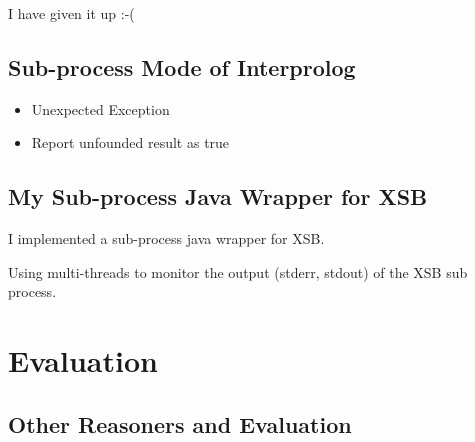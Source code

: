 \documentclass{article}
\begin{document}
I have given it up :-(


\subsection{Sub-process Mode of Interprolog}

\begin{itemize}
\item Unexpected Exception
\item Report unfounded result as true
\end{itemize}

\subsection{My Sub-process Java Wrapper for XSB}

I implemented a sub-process java wrapper for XSB.

Using multi-threads to monitor the output (stderr, stdout) of the XSB
sub process.

\section{Evaluation}

\subsection{Other Reasoners and Evaluation}
\end{document}
